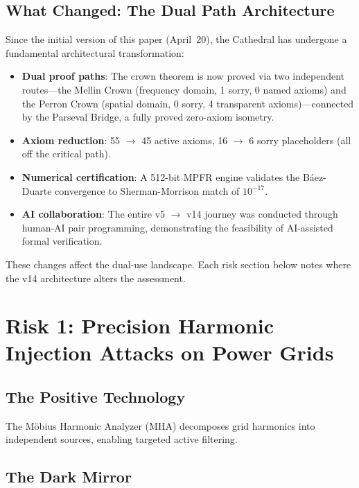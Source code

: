 \documentclass[11pt,a4paper]{article}
\begin{document}
\subsection{What Changed: The Dual Path Architecture}

Since the initial version of this paper (April~20), the Cathedral
has undergone a fundamental architectural transformation:

\begin{itemize}
  \item \textbf{Dual proof paths}: The crown theorem is now proved
    via two independent routes---the Mellin Crown (frequency domain,
    1 sorry, 0 named axioms) and the Perron Crown (spatial domain,
    0 sorry, 4 transparent axioms)---connected by the Parseval
    Bridge, a fully proved zero-axiom isometry.
  \item \textbf{Axiom reduction}: 55 $\to$ 45 active axioms,
    16 $\to$ 6 sorry placeholders (all off the critical path).
  \item \textbf{Numerical certification}: A 512-bit MPFR engine
    validates the B\'aez-Duarte convergence to Sherman-Morrison
    match of $10^{-17}$.
  \item \textbf{AI collaboration}: The entire v5 $\to$ v14 journey
    was conducted through human-AI pair programming, demonstrating
    the feasibility of AI-assisted formal verification.
\end{itemize}

These changes affect the dual-use landscape. Each risk section
below notes where the v14 architecture alters the assessment.

\section{Risk 1: Precision Harmonic Injection Attacks on Power Grids}
\label{sec:harmonics}

\subsection{The Positive Technology}

The M\"obius Harmonic Analyzer (MHA) decomposes grid harmonics into
independent sources, enabling targeted active filtering.

\subsection{The Dark Mirror}
\end{document}
